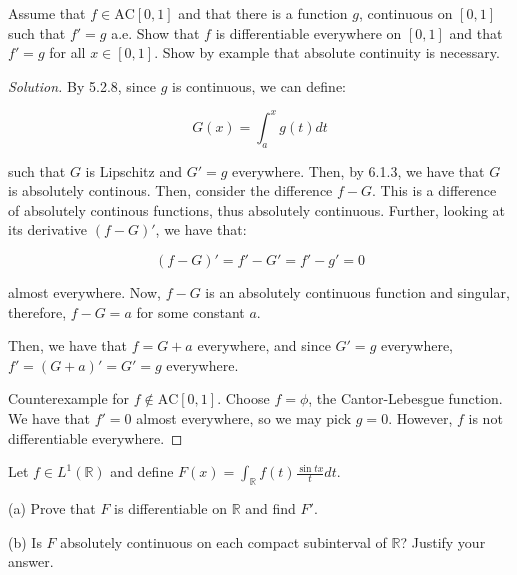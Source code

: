\documentclass[10pt]{article}
\newcommand{\ac}{{\text{AC}}}
\newenvironment{problem}[2][Problem]{\begin{trivlist}
\item[\hskip \labelsep {\bfseries #1}\hskip \labelsep {\bfseries #2.}]}{\end{trivlist}}
\begin{document}
\begin{problem}{3}

Assume that $f \in \ac[0,1]$ and that there is a function $g$, continuous on $[0,1]$ such that $f' = g$ a.e.  Show that $f$ is differentiable everywhere on $[0,1]$ and that $f' = g$ for all $x \in [0,1]$. Show by example that absolute continuity is necessary.

\end{problem}

\begin{proof}[Solution]

By 5.2.8, since $g$ is continuous, we can define:

$$ G(x) = \int_a^x g(t) dt $$

such that $G$ is Lipschitz and $G' = g$ everywhere. Then, by 6.1.3, we have that $G$ is absolutely continous. Then, consider the difference $f - G$. This is a difference of absolutely continous functions, thus absolutely continuous. Further, looking at its derivative $(f - G)'$, we have that:

$$(f - G)' = f' - G' = f' - g' = 0 $$ 

almost everywhere. Now, $f - G$ is an absolutely continuous function and singular, therefore, $f - G = a$ for some constant $a$.

Then, we have that $f = G + a$ everywhere, and since $G' = g$ everywhere, $f' = (G + a)' = G' = g$ everywhere.

Counterexample for $f \not \in \ac[0,1]$. Choose $f = \phi$, the Cantor-Lebesgue function. We have that $f' = 0$ almost everywhere, so we may pick $g = 0$. However, $f$ is not differentiable everywhere.

\end{proof}

\begin{problem}{4}

Let $f \in L^1(\mathbb{R})$ and define $F(x) = \int_\mathbb{R} f(t) \frac{\sin tx}{t} dt$.

(a) Prove that $F$ is differentiable on $\mathbb{R}$ and find $F'$.

(b) Is $F$ absolutely continuous on each compact subinterval of $\mathbb{R}$? Justify your answer.

\end{problem}
\end{document}
